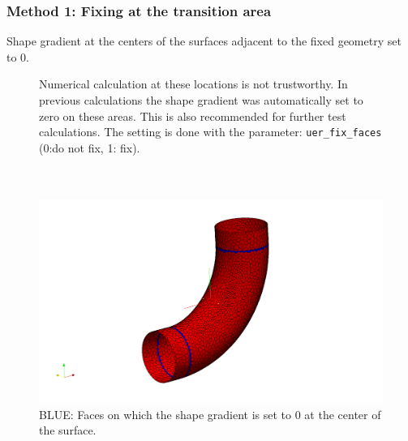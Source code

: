 \documentclass[oneside]{article}
\numberwithin{equation}{section}
\numberwithin{figure}{section}
\numberwithin{figure}{section}
\begin{document}
\subsubsection{Method 1: Fixing at the transition area}
Shape gradient at the centers of the surfaces adjacent to the fixed geometry set to 0.
\begin{figure}[h]
    \centering
    \begin{minipage}[b]{5 cm}
        Numerical calculation at these locations is not trustworthy. In previous calculations the shape gradient was automatically set to zero on these areas. This is also recommended for further test calculations. The setting is done with the parameter: \verb|uer_fix_faces| (0:do not fix, 1: fix).$ $\\
        $ $\\
        $ $\\
    \end{minipage}
    \begin{minipage}[b]{6 cm}
        \includegraphics[scale=0.14]{inlet_outlet_fg_fix.png} 
        \caption{BLUE: Faces on which the shape gradient is set to 0 at the center of the surface.}
        \label{uer_model}
    \end{minipage}
\end{figure}
\end{document}
